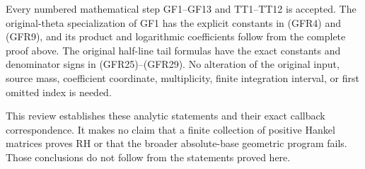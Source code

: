 Every numbered mathematical step GF1--GF13 and TT1--TT12 is accepted. The original-theta specialization of GF1 has the explicit constants in (GFR4) and (GFR9), and its product and logarithmic coefficients follow from the complete proof above. The original half-line tail formulas have the exact constants and denominator signs in (GFR25)--(GFR29). No alteration of the original input, source mass, coefficient coordinate, multiplicity, finite integration interval, or first omitted index is needed.

This review establishes these analytic statements and their exact callback correspondence. It makes no claim that a finite collection of positive Hankel matrices proves RH or that the broader absolute-base geometric program fails. Those conclusions do not follow from the statements proved here.
